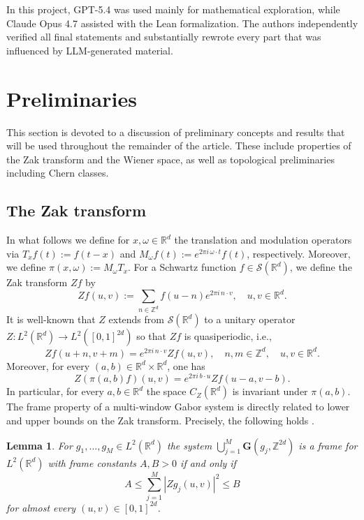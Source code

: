 \documentclass[reqno,a4paper,12pt]{amsart}
\numberwithin{equation}{section}
\newtheorem{lemma}[definition]{Lemma}
\def\Z{{\mathbb Z}}
\def\R{{\mathbb R}}
\newcommand{\Rd}{{\R^d}}
\newcommand{\ltd}{{L^2(\R^d)}}
\newcommand\1{\mathds{1}}
\begin{document}
In this project, GPT-5.4 was used mainly for mathematical exploration, while Claude Opus 4.7 assisted with the Lean formalization. The authors independently verified all final statements and substantially rewrote every part that was influenced by LLM-generated material.


\section{Preliminaries}

This section is devoted to a discussion of preliminary concepts and results that will be used throughout the remainder of the article. These include properties of the Zak transform and the Wiener space, as well as topological preliminaries including Chern classes.

\subsection{The Zak transform}

In what follows we define for $x,\omega  \in \Rd$ the translation and modulation operators via $T_xf(t):=f(t-x)$ and $M_\omega f(t):=e^{2\pi i\,\omega\cdot t}f(t)$, respectively. Moreover, we define $\pi(x,\omega):=M_\omega T_x$.
For a Schwartz function $f\in\mathcal S(\mathbb R^d)$, we define the Zak transform $Zf$ by
$$
Zf(u,v):=\sum_{n\in\mathbb Z^d} f(u-n)e^{2\pi i\,n\cdot v},
\quad u,v\in\mathbb R^d.
$$
It is well-known that $Z$ extends from $\mathcal{S}(\Rd)$ to a unitary operator $Z:L^2(\mathbb R^d)\to L^2([0,1]^{2d})$ so that $Zf$ is quasiperiodic, i.e.,
$$
Zf(u+n,v+m)
=
e^{2\pi i\,n\cdot v}Zf(u,v),
\quad n,m\in\mathbb Z^d, \quad u,v \in \Rd.
$$
Moreover, for every $(a,b)\in\mathbb R^d\times\mathbb R^d$, one has
\begin{equation}\label{eq:Zak_TS_property}
    Z(\pi(a,b)f)(u,v)
=
e^{2\pi i\,b\cdot u}Zf(u-a,v-b).
\end{equation}
In particular, for every $a,b \in \R^d$ the space $C_Z(\mathbb R^d)$ is invariant under $\pi(a,b)$. The frame property of a multi-window Gabor system is directly related to lower and upper bounds on the Zak transform. Precisely, the following holds \cite[p.~159]{Groechenig}.

\begin{lemma}\label{lma:Zak_frame}
    For $g_1,\dots,g_M\in \ltd $ the system
$
\bigcup_{j=1}^M\mathbf G(g_j,\Z^{2d})
$
is a frame for $L^2(\mathbb R^d)$ with frame constants $A,B>0$ if and only if
$$
A\le \sum_{j=1}^M |Zg_j(u,v)|^2\le B
$$
for almost every $(u,v)\in[0,1]^{2d}$.
\end{lemma}
\end{document}
